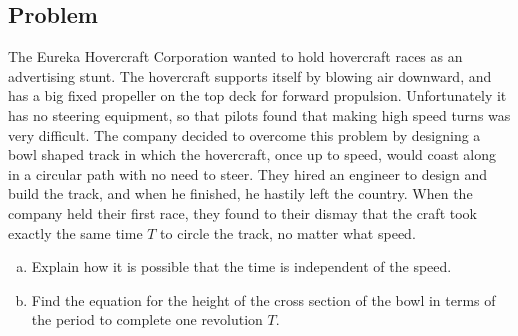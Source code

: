 \documentclass[solutions]{esg8012pset}
\begin{document}
\subsection{Problem}
  The Eureka Hovercraft Corporation wanted to hold hovercraft races as an advertising stunt. The hovercraft supports itself by blowing air downward, and has a big fixed propeller on the top deck for forward propulsion. Unfortunately it has no steering equipment, so that pilots found that making high speed turns was very difficult. The company decided to overcome this problem by designing a bowl shaped track in which the hovercraft, once up to speed, would coast along in a circular path with no need to steer. They hired an engineer to design and build the track, and when he finished, he hastily left the country. When the company held their first race, they found to their dismay that the craft took exactly the same time $T$ to circle the track, no matter what speed.
  \begin{enumerate}[a)]
    \item Explain how it is possible that the time is independent of the speed.
    \item Find the equation for the height of the cross section of the bowl in terms of the period to complete one revolution $T$.
  \end{enumerate}
\end{document}
